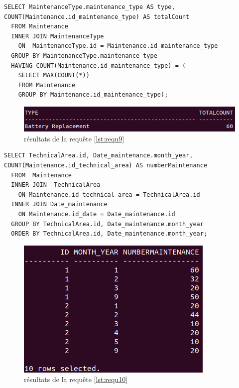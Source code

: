 \documentclass[a4paper,12pt]{report}
\begin{document}
\newpage

\begin{lstlisting}[caption={le type de maintenance le plus fréquent}, label={lst:requ9}]
  SELECT MaintenanceType.maintenance_type AS type, COUNT(Maintenance.id_maintenance_type) AS totalCount
  FROM Maintenance
  INNER JOIN MaintenanceType
    ON  MaintenanceType.id = Maintenance.id_maintenance_type
  GROUP BY MaintenanceType.maintenance_type
  HAVING COUNT(Maintenance.id_maintenance_type) = (
    SELECT MAX(COUNT(*))
    FROM Maintenance
    GROUP BY Maintenance.id_maintenance_type);
\end{lstlisting}

\begin{figure}[!ht]
  \centering
  \includegraphics[scale=0.5]{images/requetes_analytiques/requ9.png}
  \caption{résultats de la requête \ref{lst:requ9}}
\end{figure}

\newpage

\begin{lstlisting}[caption={le nombre de maintenances par mois pour chaque local technique}, label={lst:requ10}]
  SELECT TechnicalArea.id, Date_maintenance.month_year, COUNT(Maintenance.id_technical_area) AS numberMaintenance
  FROM  Maintenance
  INNER JOIN  TechnicalArea
    ON Maintenance.id_technical_area = TechnicalArea.id
  INNER JOIN Date_maintenance
    ON Maintenance.id_date = Date_maintenance.id
  GROUP BY TechnicalArea.id, Date_maintenance.month_year
  ORDER BY TechnicalArea.id, Date_maintenance.month_year;
\end{lstlisting}

\begin{figure}[!ht]
  \centering
  \includegraphics[scale=0.5]{images/requetes_analytiques/requ10.png}
  \caption{résultats de la requête \ref{lst:requ10}}
\end{figure}
\end{document}
